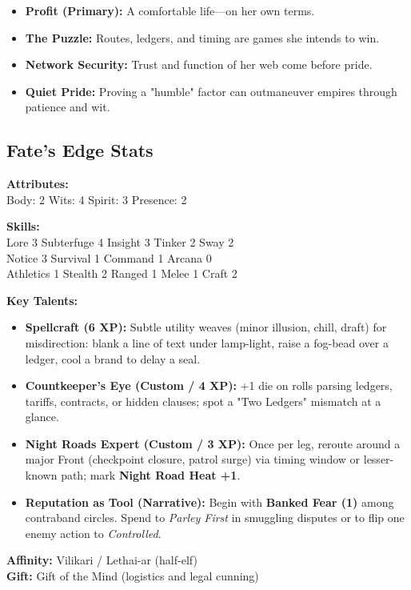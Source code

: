 \begin{itemize}
    \item \textbf{Profit (Primary):} A comfortable life---on her own terms.
    \item \textbf{The Puzzle:} Routes, ledgers, and timing are games she intends to win.
    \item \textbf{Network Security:} Trust and function of her web come before pride.
    \item \textbf{Quiet Pride:} Proving a "humble" factor can outmaneuver empires through patience and wit.
\end{itemize}

\subsection*{Fate's Edge Stats}

\textbf{Attributes:} \\
Body: 2 \quad Wits: 4 \quad Spirit: 3 \quad Presence: 2

\textbf{Skills:} \\
Lore 3 \quad Subterfuge 4 \quad Insight 3 \quad Tinker 2 \quad Sway 2 \\
Notice 3 \quad Survival 1 \quad Command 1 \quad Arcana 0 \\
Athletics 1 \quad Stealth 2 \quad Ranged 1 \quad Melee 1 \quad Craft 2

\textbf{Key Talents:}
\begin{itemize}
    \item \textbf{Spellcraft (6 XP):} Subtle utility weaves (minor illusion, chill, draft) for misdirection: blank a line of text under lamp-light, raise a fog-bead over a ledger, cool a brand to delay a seal.
    \item \textbf{Countkeeper's Eye (Custom / 4 XP):} +1 die on rolls parsing ledgers, tariffs, contracts, or hidden clauses; spot a "Two Ledgers" mismatch at a glance.
    \item \textbf{Night Roads Expert (Custom / 3 XP):} Once per leg, reroute around a major Front (checkpoint closure, patrol surge) via timing window or lesser-known path; mark \textbf{Night Road Heat +1}.
    \item \textbf{Reputation as Tool (Narrative):} Begin with \textbf{Banked Fear (1)} among contraband circles. Spend to \emph{Parley First} in smuggling disputes or to flip one enemy action to \emph{Controlled}.
\end{itemize}

\textbf{Affinity:} Vilikari / Lethai-ar (half-elf) \\
\textbf{Gift:} Gift of the Mind (logistics and legal cunning)

